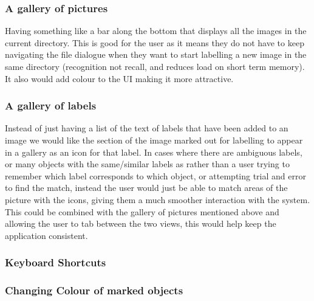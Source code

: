\documentclass[a4paper,11pt,oneside]{article}
\begin{document}
\subsubsection{A gallery of pictures} 
Having something like a bar along the bottom that displays all the images in the current directory.  This is good for the user as it means they do not have to keep navigating the file dialogue when they want to start labelling a new image in the same directory (recognition not recall, and reduces load on short term memory).  It also would add colour to the UI making it more attractive.
\subsubsection{A gallery of labels}
Instead of just having a list of the text of labels that have been added to an image we would like the section of the image marked out for labelling to appear in a gallery as an icon for that label.  In cases where there are ambiguous labels, or many objects with the same/similar labels as rather than a user trying to remember which label corresponds to which object, or attempting trial and error to find the match, instead the user would just be able to match areas of the picture with the icons, giving them a much smoother interaction with the system.  This could be combined with the gallery of pictures mentioned above and allowing the user to tab between the two views, this would help keep the application consistent.
\subsubsection{Keyboard Shortcuts}
\subsubsection{Changing Colour of marked objects}
\end{document}
